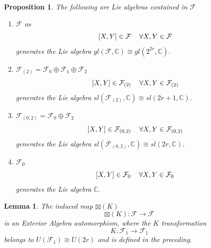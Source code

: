 \documentclass[aps, preprint]{revtex4}
\newtheorem{lemma}[theorem]{Lemma}
\newtheorem{proposition}[theorem]{Proposition}
\begin{document}
\begin{proposition}
The following are Lie algebras contained in $\mathcal{F}$ 


\begin{enumerate}
\item $\mathcal{F}$ as
\begin{equation}\left [X ,Y\right ] \in \mathcal{F}\text{\thinspace \quad } \forall X ,Y \in \mathcal{F}
\end{equation}generates the Lie algebra $g l \left (\mathcal{F} ,\mathbb{C}\right ) \cong g l \left (2^{2 r} ,\mathbb{C}\right )\text{.}$ 

\item $\mathcal{F}_{\left (2\right )} =\mathcal{F}_{0} \oplus \mathcal{F}_{1} \oplus \mathcal{F}_{2}$
\begin{equation}\left [X ,Y\right ] \in \mathcal{F}_{\left (2\right )}\text{\thinspace \quad } \forall X ,Y \in \mathcal{F}_{\left (2\right )}
\end{equation}generates the Lie algebra $s l \left (\mathcal{F}_{\left (2\right )} ,\mathbb{C}\right ) \cong s l \left (2 r +1 ,\mathbb{C}\right )\text{.}$ 

\item $\mathcal{F}_{\left (0 ,2\right )} =\mathcal{F}_{0} \oplus \mathcal{F}_{2}$
\begin{equation}\left [X ,Y\right ] \in \mathcal{F}_{\left (0 ,2\right )}\text{\thinspace \quad } \forall X ,Y \in \mathcal{F}_{\left (0 ,2\right )}
\end{equation}generates the Lie algebra $s l \left (\mathcal{F}_{\left (0 ,2\right )} ,\mathbb{C}\right ) \cong s l \left (2 r ,\mathbb{C}\right )\text{.}$ 

\item $\mathcal{F}_{0}$
\begin{equation}\left [X ,Y\right ] \in \mathcal{F}_{0}\text{\thinspace \quad } \forall X ,Y \in \mathcal{F}_{0}
\end{equation}generates the Lie algebra $\mathbb{C}\text{.}$ \end{enumerate}
\end{proposition}


\begin{lemma}
The induced map $ \boxtimes \left (K\right )$
\begin{equation} \boxtimes \left (K\right ) :\mathcal{F} \rightarrow \mathcal{F}
\end{equation}is an \emph{Exterior Algebra} automorphism, where the $K$ transformation
\begin{equation}K :\mathcal{F}_{1} \rightarrow \mathcal{F}_{1}
\end{equation}belongs to $U \left (\mathcal{F}_{1}\right ) \cong U \left (2 r\right )$ and is defined in the preceding$\text{.}$ 
\end{lemma}
\end{document}
